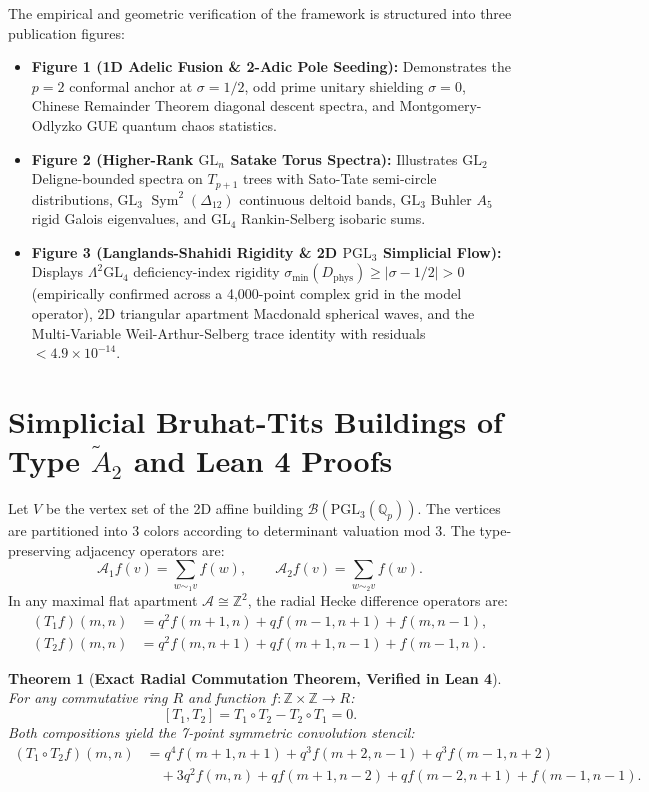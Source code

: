 \documentclass[11pt,reqno,a4paper]{article}
\newtheorem{theorem}{Theorem}[section]
\theoremstyle{definition}
\begin{document}
The empirical and geometric verification of the framework is structured into three publication figures:
\begin{itemize}
    \item \textbf{Figure 1 (1D Adelic Fusion \& 2-Adic Pole Seeding):} Demonstrates the $p=2$ conformal anchor at $\sigma = 1/2$, odd prime unitary shielding $\sigma = 0$, Chinese Remainder Theorem diagonal descent spectra, and Montgomery-Odlyzko GUE quantum chaos statistics.
    \item \textbf{Figure 2 (Higher-Rank $\mathrm{GL}_n$ Satake Torus Spectra):} Illustrates $\mathrm{GL}_2$ Deligne-bounded spectra on $T_{p+1}$ trees with Sato-Tate semi-circle distributions, $\mathrm{GL}_3$ $\operatorname{Sym}^2(\Delta_{12})$ continuous deltoid bands, $\mathrm{GL}_3$ Buhler $A_5$ rigid Galois eigenvalues, and $\mathrm{GL}_4$ Rankin-Selberg isobaric sums.
    \item \textbf{Figure 3 (Langlands-Shahidi Rigidity \& 2D $\mathrm{PGL}_3$ Simplicial Flow):} Displays $\Lambda^2\mathrm{GL}_4$ deficiency-index rigidity $\sigma_{\min}(D_{\mathrm{phys}}) \ge |\sigma - 1/2| > 0$ (empirically confirmed across a 4,000-point complex grid in the model operator), 2D triangular apartment Macdonald spherical waves, and the Multi-Variable Weil-Arthur-Selberg trace identity with residuals $< 4.9 \times 10^{-14}$.
\end{itemize}

\section{Simplicial Bruhat-Tits Buildings of Type $\tilde{A}_2$ and Lean 4 Proofs}

Let $V$ be the vertex set of the 2D affine building $\mathcal{B}(\mathrm{PGL}_3(\mathbb{Q}_p))$. The vertices are partitioned into 3 colors according to determinant valuation mod 3. The type-preserving adjacency operators are:
\[
\mathcal{A}_1 f(v) = \sum_{w \sim_1 v} f(w), \qquad \mathcal{A}_2 f(v) = \sum_{w \sim_2 v} f(w).
\]
In any maximal flat apartment $\mathcal{A} \cong \mathbb{Z}^2$, the radial Hecke difference operators are:
\begin{align*}
(T_1 f)(m, n) &= q^2 f(m+1, n) + q f(m-1, n+1) + f(m, n-1), \\
(T_2 f)(m, n) &= q^2 f(m, n+1) + q f(m+1, n-1) + f(m-1, n).
\end{align*}

\begin{theorem}[\textbf{Exact Radial Commutation Theorem, Verified in Lean 4}]
For any commutative ring $R$ and function $f : \mathbb{Z} \times \mathbb{Z} \to R$:
\[
[T_1, T_2] = T_1 \circ T_2 - T_2 \circ T_1 = 0.
\]
Both compositions yield the 7-point symmetric convolution stencil:
\begin{align*}
(T_1 \circ T_2 f)(m, n) &= q^4 f(m+1, n+1) + q^3 f(m+2, n-1) + q^3 f(m-1, n+2) \\
&\quad + 3q^2 f(m, n) + q f(m+1, n-2) + q f(m-2, n+1) + f(m-1, n-1).
\end{align*}
\end{theorem}
\end{document}
